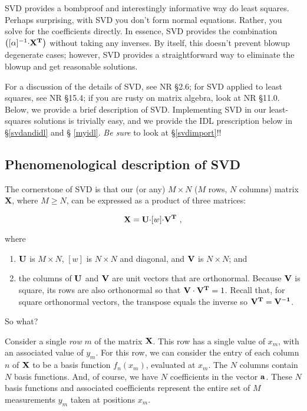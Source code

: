 \documentclass[psfig,preprint]{aastex}
\begin{document}
	SVD provides a bombproof and interestingly informative way do
least squares.  Perhaps surprising, with SVD you don't form normal
equations.  Rather, you solve for the coefficients directly.  In
essence, SVD provides the combination $\left( [\alpha]^{-1} {\bf \cdot
X^T} \right)$ without taking any inverses.  By itself, this doesn't
prevent blowup degenerate cases; however, SVD provides a straightforward
way to eliminate the blowup and get reasonable solutions. 

For a discussion of the details of SVD, see NR \S 2.6; for SVD applied
to least squares, see NR \S 15.4; if you are rusty on matrix algebra,
look at NR \S 11.0. Below, we provide a brief description of
SVD. Implementing SVD in our least-squares solutions is trivially easy,
and we provide the IDL prescription below in \S \ref{svdandidl} and \S
\ref{myidl}.  {\it Be sure} to look at \S \ref{svdimport}!!

\subsection{Phenomenological description of SVD} \label{svdphenom}

The cornerstone of SVD is that our (or any) $M \times N$ ($M$ rows, $N$
columns) matrix {\bf X}, where $M \ge N$, can be expressed as a product
of three matrices:

\begin{equation} \label{basicsvd}
{\bf X} = {\bf U \cdot} [ w ] {\bf \cdot V^T}
\ ,
\end{equation}

\noindent where \begin{enumerate}

	\item $\bf U$ is $M \times N$, $[w]$ is $N \times N$ and
diagonal, and $\bf V$ is $N \times N$; and

	\item the columns of $\bf U$ and $\bf V$ are unit vectors that are
orthonormal. Because $\bf V$ is square, its rows are also orthonormal so
that ${\bf V \cdot V^T} = 1$. Recall that, for square orthonormal
vectors, the transpose equals the inverse so $\bf V^T = V^{-1}$.

\end{enumerate}

\noindent So what?

Consider a single {\it row} $m$ of the matrix $\bf X$. This row has a
single value of $x_m$, with an associated value of $y_m$. For this row,
we can consider the entry of each column $n$ of $\bf X$ to be a basis
function $f_n(x_m)$, evaluated at $x_m$. The $N$ columns contain $N$
basis functions. And, of course, we have $N$ coefficients in the
vector $\bf a$. These $N$ basis functions and associated coefficients
represent the entire set of $M$ measurements $y_m$ taken at positions
$x_m$.
\end{document}
